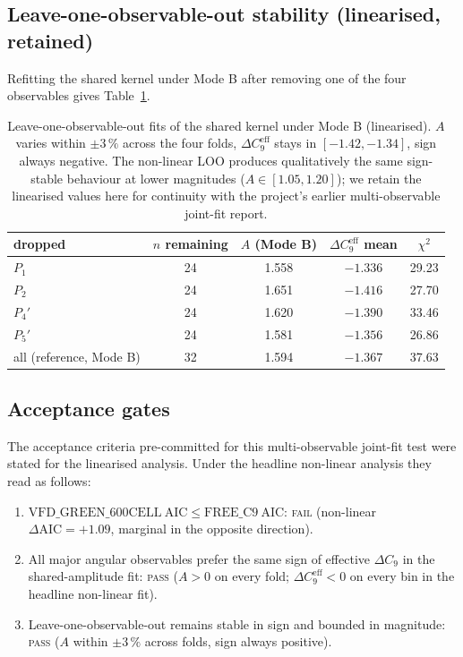 \subsection{Leave-one-observable-out stability (linearised, retained)}

Refitting the shared kernel under Mode B after removing one of the
four observables gives Table~\ref{tab:loo_obs}.

\begin{table}[h]
\centering
\small
\begin{tabular}{lcccc}
\toprule
dropped & $n$ remaining & $A$ (Mode B) & $\Delta C_{9}^{\mathrm{eff}}$ mean & $\chi^{2}$ \\
\midrule
$P_{1}$  & 24 & 1.558 & $-1.336$ & 29.23 \\
$P_{2}$  & 24 & 1.651 & $-1.416$ & 27.70 \\
$P_{4}'$ & 24 & 1.620 & $-1.390$ & 33.46 \\
$P_{5}'$ & 24 & 1.581 & $-1.356$ & 26.86 \\
\midrule
all (reference, Mode B)  & 32 & 1.594 & $-1.367$ & 37.63 \\
\bottomrule
\end{tabular}
\caption{Leave-one-observable-out fits of the shared kernel under
Mode B (linearised). $A$ varies within $\pm 3\,\%$ across the four
folds, $\Delta C_{9}^{\mathrm{eff}}$ stays in $[-1.42, -1.34]$, sign
always negative. The non-linear LOO produces qualitatively the same
sign-stable behaviour at lower magnitudes
($A\in[1.05, 1.20]$); we retain the linearised values here for
continuity with the project's earlier multi-observable joint-fit
report.}
\label{tab:loo_obs}
\end{table}

\subsection{Acceptance gates}

The acceptance criteria pre-committed for this multi-observable
joint-fit test were stated for the linearised analysis. Under the
headline non-linear analysis they read as follows:
\begin{enumerate}[label=(\roman*)]
\item $\mathrm{VFD\_GREEN\_600CELL}\ \mathrm{AIC} \leq \mathrm{FREE\_C9}\ \mathrm{AIC}$:
  \textsc{fail} (non-linear $\Delta\mathrm{AIC}=+1.09$, marginal in
  the opposite direction).
\item All major angular observables prefer the same sign of effective
  $\Delta C_{9}$ in the shared-amplitude fit:
  \textsc{pass} ($A>0$ on every fold; $\Delta C_{9}^{\mathrm{eff}}<0$
  on every bin in the headline non-linear fit).
\item Leave-one-observable-out remains stable in sign and bounded in
  magnitude: \textsc{pass} ($A$ within $\pm 3\,\%$ across folds, sign
  always positive).
\end{enumerate}

